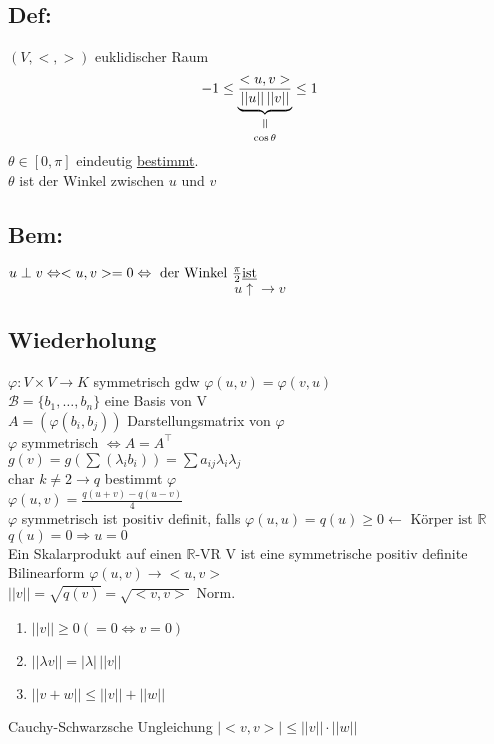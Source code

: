 \documentclass[titlepage,12pt,a4paper,ngerman]{report}
\newcommand{\verteq}{\rotatebox{90}{$\,=$}}
\newcommand{\equalto}[2]{\underset{\scriptstyle\overset{\mkern4mu\verteq}{#2}}{#1}}
\newcommand{\tx}[1]{\textrm{#1}}
\newcommand{\ub}[1]{\underbrace{#1}}
\begin{document}
\subsection{Def:}
$ (V,<,>) $ euklidischer Raum
$$ -1 \le \equalto{\ub{ \frac{<u,v>}{||u||\, ||v||} }}{\cos \theta} \le 1$$
$ \theta \in [0,\pi] $ eindeutig \underline{bestimmt}.\\
$ \theta $ ist der Winkel zwischen $ u $ und $ v $
\subsection*{Bem:}
$ u \perp v \Leftrightarrow <u,v> = 0 \Leftrightarrow \tx{ der Winkel } \frac{\pi}{2} \tx{\underline{ist}} $
$$ u \uparrow \rightarrow v$$


\subsection{Wiederholung}
$ \varphi : V \times V \to K $
symmetrisch gdw $ \varphi(u,v) = \varphi(v,u) $\\
$ \mathcal{B}= \{b_1,\dots, b_n\} $ eine Basis von V \\
$A = (\varphi(b_i,b_j)) $ Darstellungsmatrix von $ \varphi $\\
$ \varphi $ symmetrisch $ \Leftrightarrow  A = A^\top$\\
$ g(v) = g(\sum(\lambda_i b_i)) =\sum a_{ij} \lambda_i \lambda_j $\\
$ \tx{char } k \neq 2 \rightarrow q $ bestimmt $ \varphi $\\
$ \varphi(u,v) = \frac{q(u+v) - q(u-v)}{4} $\\
$ \varphi $ symmetrisch ist positiv definit, falls $ \varphi(u,u) = q(u) \ge 0 \leftarrow \tx{ Körper ist } \mathbb{R} $\\
$ q(u) = 0 \Rightarrow u = 0 $\\
Ein Skalarprodukt auf einen $ \mathbb{R} $-VR V ist eine symmetrische positiv definite Bilinearform
$ \varphi(u,v) \to <u,v> $\\
$ ||v||=\sqrt{q(v)} = \sqrt{<v,v>}$ Norm. \\
\begin{enumerate}[1)]
	\item $ ||v||\ge 0 ( = 0 \Leftrightarrow v = 0) $
	\item $ ||\lambda v || = | \lambda|\, ||v|| $
	\item $ ||v+w|| \le ||v|| + ||w|| $
\end{enumerate}
Cauchy-Schwarzsche Ungleichung $ |<v,v>| \le ||v|| \cdot ||w|| $
\end{document}
